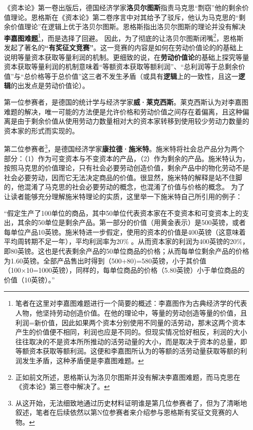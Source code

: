 \documentclass[a4paper,twoside,12pt,AutoFakeBold]{ctexart}
\begin{document}
《资本论》第一卷出版后，德国经济学家\textbf{洛贝尔图斯}指责马克思“剽窃”他的剩余价值理论。恩格斯在《资本论》第二卷序言中对其给予了驳斥，他认为马克思的“剩余价值理论”在逻辑上优于洛贝尔图斯。恩格斯指出洛贝尔图斯的理论并没有解决\textbf{李嘉图难题}\footnote{笔者在这里对李嘉图难题进行一个简要的概述：李嘉图作为古典经济学的代表人物，他坚持劳动创造价值。在他的理论中，等量的劳动创造等量的价值，且利润=新价值，因此如果两个资本分别使用不同量的活劳动，那末这两个资本产生的价值便不相同，利润也应是不同的。但现实情况恰好相反，利润的大小往往取决的不是资本所所推动的活劳动量的大小，而是取决于资本的总量，即等额资本获取等额利润。这便和李嘉图所认为的等额的活劳动量获取等额的利润发生矛盾，这种矛盾便是李嘉图难题。}，而是选择了回避。
因此，为了彻底的让洛贝尔图斯闭嘴\footnote{正如前文所述，恩格斯认为洛贝尔图斯并没有解决李嘉图难题，而马克思在《资本论》第三卷中解决了。}，恩格斯发起了著名的\textbf{“有奖征文竞赛”}。这一竞赛的内容是如何在劳动价值论的的基础上说明等量资本获取等量利润的机制。更细致的说，在\textbf{劳动价值论}的基础上探究等量资本获取等量利润的机制意味着“等额资本获取等额利润”、“总利润等于总剩余价值”与“总价格等于总价值”这三者不发生矛盾（或具有\textbf{逻辑}上的一致性，且这一\textbf{逻辑}的出发点是劳动价值论）。

第一位参赛者，是德国的统计学与经济学家\textbf{威·莱克西斯}。莱克西斯认为对李嘉图难题的解决，唯一可能的方法便是允许价格和劳动价值之间存在着偏离，且这种偏离是由于剩余价值从使用劳动力数量相对大的资本家转移到使用较少劳动力数量的资本家的形式而实现的。

第二位参赛者\footnote{从这开始，无法细致地通过历史材料证明谁是第几位参赛者了，但为了清晰地叙述，笔者在后续依然以第N位参赛者来介绍参与恩格斯有奖征文竞赛的人物。}，是德国经济学家\textbf{康拉德·施米特}。施米特将社会总产品分为两个部分：（1）作为可变资本与不变资本的产品，（2）作为剩余的产品。施米特认为，按照马克思的价值理论，只有社会必要劳动创造价值，剩余产品中的物化劳动不是社会必要劳动，因而它无法决定商品的价值。很显然，施米特的解释是站不住脚的，他混淆了马克思的社会必要劳动的概念，也混淆了价值与价格的概念。
为了让读者能够充分理解施米特理论的实质，这里举一下施米特自己所引用的例子：

\begin{fangsong}
    “假定生产了100单位的商品，其中50单位代表资本家在不变资本和可变资本上的支出，其余的50单位是剩余产品。第一部分的价值（用黄金表示）是500英镑，或者每单位产品10英镑。施米特进一步假定，使用的资本的价值是400英镑（这意味着平均周转期不足一年），平均利润率为20\% 。从而资本家的利润为400英镑的20\%，即80英镑。这也是代表剩余产品的50单位商品的价格；从而每单位剩余产品的价格为1.60英镑。全部产品售出时得到（500+80)=580英镑，小于其价值（100×10=1000英镑），同样的，每单位商品的价格（5.80英镑）小于单位商品的价值（10英镑）。”
\end{fangsong}
\end{document}
